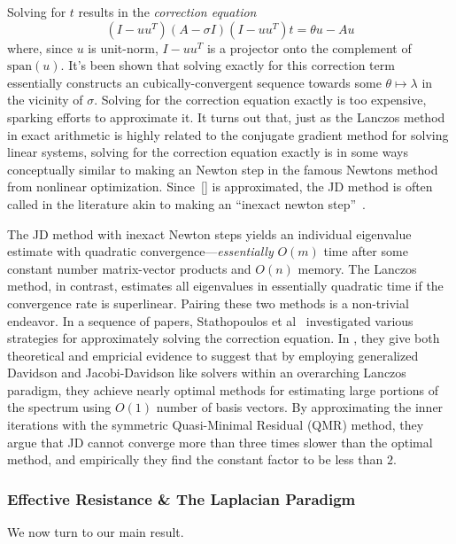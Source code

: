 \documentclass[10pt]{article}
\numberwithin{equation}{section}
\newcommand{\+}{%
	\raisebox{0.18ex}{\scaleobj{0.55}{+}}
}
\theoremstyle{definition}
\begin{document}
Solving for $t$ results in the \emph{correction equation}
\begin{equation}
	(I - u u^T)(A - \sigma I )(I - u u^T) t = \theta u - A u 
\end{equation}
where, since $u$ is unit-norm, $I - u u^T$ is a projector onto the complement of $\mathrm{span}(u)$. 
It's been shown that solving exactly for this correction term essentially constructs an cubically-convergent sequence towards some $\theta \mapsto \lambda$ in the vicinity of $\sigma$. Solving for the correction equation exactly is too expensive, sparking efforts to approximate it. It turns out that, just as the Lanczos method in exact arithmetic is highly related to the conjugate gradient method for solving linear systems, solving for the correction equation exactly is in some ways conceptually similar to making an Newton step in the famous Newtons method from nonlinear optimization. Since~\eqref{} is approximated, the JD method is often called in the literature akin to making an ``inexact newton step''~\cite{}.


The JD method with inexact Newton steps yields an individual eigenvalue estimate with quadratic convergence---\emph{essentially} $O(m)$ time after some constant number matrix-vector products and $O(n)$ memory.
The Lanczos method, in contrast, estimates all eigenvalues in essentially quadratic time if the convergence rate is superlinear. Pairing these two methods is a non-trivial endeavor. 
In a sequence of papers, Stathopoulos et al~\cite{} investigated various strategies for approximately solving the correction equation. 
In , they give both theoretical and empricial evidence to suggest that by employing generalized Davidson and Jacobi-Davidson like solvers within an overarching Lanczos paradigm, they achieve nearly optimal methods for estimating large portions of the spectrum using $O(1)$ number of basis vectors. By approximating the inner iterations with the symmetric Quasi-Minimal Residual (QMR) method, they argue that JD cannot converge more than three times slower than the optimal method, and empirically they find the constant factor to be less than $2$. 

\subsubsection*{Effective Resistance \& The Laplacian Paradigm}
We now turn to our main result. 
\end{document}
